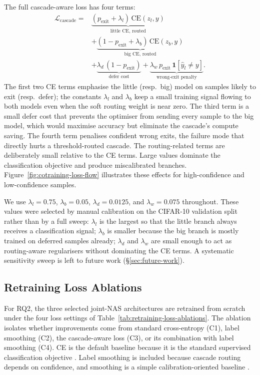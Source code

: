 \documentclass[conference]{IEEEtran}
\begin{document}
The full cascade-aware loss has four terms:
\begin{equation}
\begin{aligned}
\mathcal{L}_{\mathrm{cascade}}
={}& \underbrace{(p_{\mathrm{exit}}+\lambda_l)\,\mathrm{CE}(z_l,y)}_{\text{little CE, routed}} \\
&+ \underbrace{(1-p_{\mathrm{exit}}+\lambda_b)\,\mathrm{CE}(z_b,y)}_{\text{big CE, routed}} \\
&+ \underbrace{\lambda_d\,(1-p_{\mathrm{exit}})}_{\text{defer cost}}
+ \underbrace{\lambda_w\,p_{\mathrm{exit}}\,\mathbf{1}[\hat{y}_l \neq y]}_{\text{wrong-exit penalty}}.
\end{aligned}
\label{eq:cascade-loss}
\end{equation}
The first two CE terms emphasise the little (resp.\ big) model on samples
likely to exit (resp.\ defer); the constants $\lambda_l$ and $\lambda_b$
keep a small training signal flowing to both models even when the soft
routing weight is near zero. The third term is a small defer cost that
prevents the optimiser from sending every sample to the big model, which
would maximise accuracy but eliminate the cascade's compute saving. The
fourth term penalises confident wrong exits, the failure mode that
directly hurts a threshold-routed cascade. The routing-related terms are
deliberately small relative to the CE terms. Large values dominate the
classification objective and produce miscalibrated branches.
Figure~\ref{fig:cotraining-loss-flow} illustrates these effects for
high-confidence and low-confidence samples.

We use $\lambda_l=0.75$, $\lambda_b=0.05$, $\lambda_d=0.0125$, and
$\lambda_w=0.075$ throughout. These values were selected by manual
calibration on the CIFAR-10 validation split rather than by a full sweep:
$\lambda_l$ is the largest so that the little branch always receives a
classification signal; $\lambda_b$ is smaller because the big branch is
mostly trained on deferred samples already; $\lambda_d$ and $\lambda_w$ are
small enough to act as routing-aware regularisers without dominating the CE
terms. A systematic sensitivity sweep is left to future work
(\S\ref{sec:future-work}).

\subsection{Retraining Loss Ablations}
\label{sec:methodology:loss-ablations}

For RQ2, the three selected joint-NAS architectures are retrained from
scratch under the four loss settings of
Table~\ref{tab:retraining-loss-ablations}. The ablation isolates whether
improvements come from standard cross-entropy (C1), label smoothing (C2),
the cascade-aware loss (C3), or its combination with label smoothing (C4).
CE is the default baseline because it is the standard supervised
classification objective \cite{goodfellow2016deeplearning}.
Label smoothing is included because cascade routing depends on confidence,
and smoothing is a simple calibration-oriented baseline
\cite{mueller2019labelsmoothing,guo2017calibration}.
\end{document}
